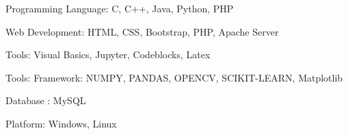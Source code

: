 
\begin{cventries}

  \cventry

    {
      \begin{cvitems} %
        \item{\small Programming Language: C, C++, Java, Python, PHP} 
        \item{\small Web Development: HTML, CSS, Bootstrap, PHP, Apache Server}
        \item{\small Tools: Visual Basics, Jupyter, Codeblocks, Latex}
        \item{\small Tools: Framework: NUMPY, PANDAS, OPENCV, SCIKIT-LEARN, Matplotlib}
        \item{\small Database : MySQL}
        \item{\small Platform: Windows, Linux}
      \end{cvitems}
    }

\end{cventries}

